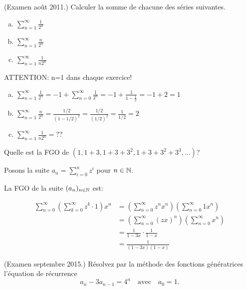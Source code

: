 \newpage


\begin{exo} (Examen ao\^ut 2011.) 
Calculer la somme de chacune des s\'eries suivantes.
%
\begin{enumerate}[a)]
\item $\displaystyle \sum_{n=1}^\infty \frac{1}{2^n}$
\item $\displaystyle \sum_{n=1}^\infty \frac{n}{2^n}$
\item $\displaystyle \sum_{n=1}^\infty \frac{1}{n 2^n}$ 
\end{enumerate}
\end{exo}

ATTENTION: n=1 dans chaque exercice!

\begin{enumerate}[a)]
\item $\displaystyle \sum_{n=1}^\infty \frac{1}{2^n} = -1 + \sum_{n=0}^\infty \frac{1}{2^n}= -1 + \frac{1}{1-\frac{1}{2}} = -1 + 2 = 1 $
\item $\displaystyle \sum_{n=1}^\infty \frac{n}{2^n} = \frac{1/2}{ (1-1/2)^2 } = \frac{1/2}{(1/2)^2} = \frac{1}{1/2} = 2$
\item $\displaystyle \sum_{n=1}^\infty \frac{1}{n 2^n} = ??$ 
\end{enumerate}


\begin{exo}
Quelle est la FGO de $(1,1+3,1+3+3^2,1+3+3^2+3^3,\ldots)$?
\end{exo}

Posons la suite $a_n = \sum_{i=0}^n z^i$ pour $n\in \mathbb{N}$.

La FGO de la suite $(a_n)_{n\in \mathbb{N}}$ est:

\begin{align*}
\sum_{n=0}^{\infty} ( \sum_{k=0}^{\infty} z^k \cdot 1) x^n &= (\sum_{n=0}^{\infty} z^n x^n) (\sum_{n=0}^{\infty} 1 x^n) \\
&= (\sum_{n=0}^{\infty} (zx)^n) (\sum_{n=0}^{\infty} x^n)\\
&= \frac{1}{1-3x} \cdot \frac{1}{1-x}\\
&= \frac{1}{(1-3x)(1-x)}
\end{align*}

\newpage

\begin{exo} (Examen septembre 2015.)
R\'esolvez par la m\'ethode des fonctions g\'en\'eratrices l'\'equation de r\'ecurrence 
\[
a_n-3a_{n-1}=4^n \quad \mathrm{avec} \quad a_0=1.
\]
\end{exo}

